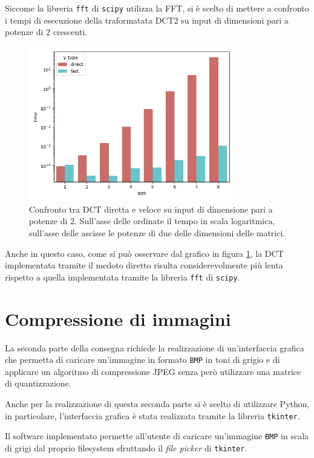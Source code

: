 \documentclass[a4paper, 12pt]{article}
\begin{document}
Siccome la libreria \texttt{fft} di \texttt{scipy} utilizza la FFT, si è scelto
di mettere a confronto i tempi di esecuzione della traformatata DCT2 su input di
dimensioni pari a potenze di 2 crescenti.

\begin{figure}[H]
  \centering
  \includegraphics[width=0.8\textwidth]{../test/benchmark-results/bench-order-0.png}
  \caption{Confronto tra DCT diretta e veloce su input di dimensione pari a
    potenze di 2. Sull'asse delle ordinate il tempo in scala logaritmica,
    sull'asse delle ascisse le potenze di due delle dimensioni delle matrici.}
  \label{fig:order-benchmark}
\end{figure}

Anche in questo caso, come si può osservare dal grafico in figura
\ref{fig:order-benchmark}, la DCT implementata tramite il medoto diretto risulta
considerevolmente più lenta rispetto a quella implementata tramite la libreria
\texttt{fft} di \texttt{scipy}.


\section{Compressione di immagini}
La seconda parte della consegna richiede la realizzazione di un'interfaccia
grafica che permetta di caricare un'immagine in formato \texttt{BMP} in toni di
grigio e di applicare un algoritmo di compressione JPEG senza però utilizzare una
matrice di quantizzazione.

Anche per la realizzazione di questa seconda parte si è scelto di utilizzare
Python, in particolare, l'interfaccia grafica è stata realizzata tramite la
libreria \texttt{tkinter}.

Il software implementato permette all'utente di caricare un'immagine
\texttt{BMP} in scala di grigi dal proprio filesystem sfruttando il \textit{file
  picker} di \texttt{tkinter}.
\end{document}
